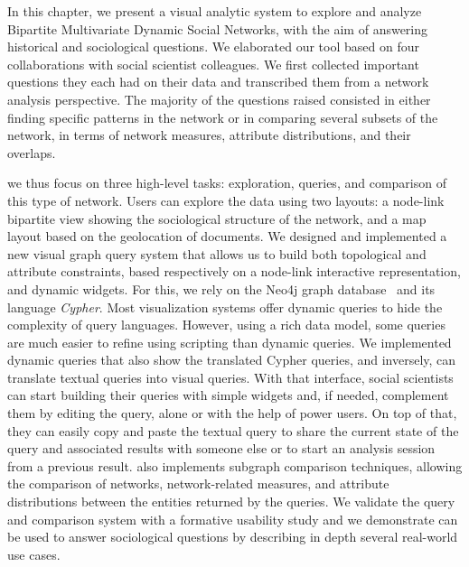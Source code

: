 
In this chapter, we present a visual analytic system to explore and analyze Bipartite Multivariate Dynamic Social Networks, with the aim of answering historical and sociological questions.
We elaborated our tool based on four collaborations with social scientist colleagues.
We first collected important questions they each had on their data and transcribed them from a network analysis perspective.
The majority of the questions raised consisted in either finding specific patterns in the network or in comparing several subsets of the network, in terms of network measures, attribute distributions, and their overlaps.

we thus focus on three high-level tasks: exploration, queries, and comparison of this type of network.
Users can explore the data using two layouts: a node-link bipartite view showing the sociological structure of the network, and a map layout based on the geolocation of documents.
We designed and implemented a new visual graph query system that allows us to build both topological and attribute constraints, based respectively on a node-link interactive representation, and dynamic widgets. For this, we rely on the Neo4j graph database~\cite{neo4j} and its language \emph{Cypher}. Most visualization systems offer dynamic queries to hide the complexity of query languages. However, using a rich data model, some queries are much easier to refine using scripting than dynamic queries. We implemented dynamic queries that also show the translated Cypher queries, and inversely, can translate textual queries into visual queries.
With that interface, social scientists can start building their queries with simple widgets and, if needed, complement them by editing the query, alone or with the help of power users. On top of that, they can easily copy and paste the textual query to share the current state of the query and associated results with someone else or to start an analysis session from a previous result.
\name also implements subgraph comparison techniques, allowing the comparison of networks, network-related measures, and attribute distributions between the entities returned by the queries.
We validate the query and comparison system with a formative usability study and we demonstrate \name can be used to answer sociological questions by describing in depth several real-world use cases.

